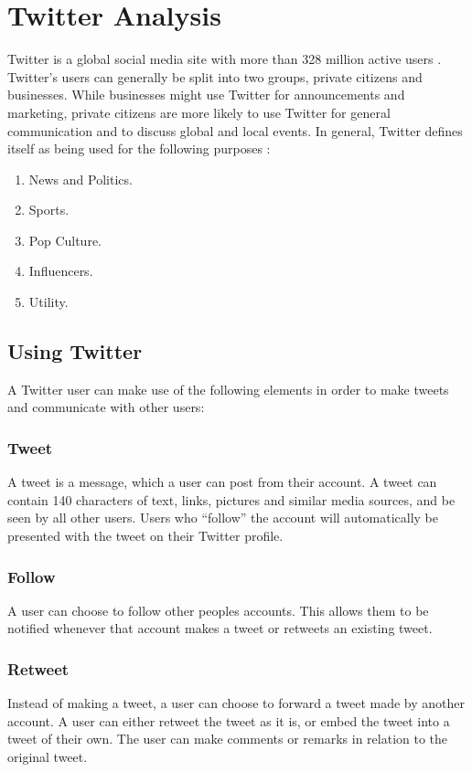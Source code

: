 \section{Twitter Analysis}\label{sec:twitter-analysis}
Twitter is a global social media site with more than 328 million active users
\citep{aboutTwitter}. Twitter's users can generally be split into two groups,
private citizens and businesses. While businesses might use Twitter for
announcements and marketing, private citizens are more likely to use Twitter for
general communication and to discuss global and local events. In general,
Twitter defines itself as being used for the following purposes
\citep{StartingTwitter}:

\begin{enumerate}    
  \item News and Politics.
  \item Sports.
  \item Pop Culture. 
  \item Influencers.
  \item Utility.
\end{enumerate} %

\subsection{Using Twitter}
A Twitter user can make use of the following elements \citep{StartingTwitter}
in order to make tweets and communicate with other users:

\subsubsection{Tweet}
A tweet is a message, which a user can post from their account. A tweet can
contain 140 characters\citep{StartingTwitter2} of text, links, pictures and
similar media sources, and be seen by all other users. Users who ``follow'' the
account will automatically be presented with the tweet on their Twitter profile.
\subsubsection{Follow}
A user can choose to follow other peoples accounts. This allows them to be
notified whenever that account makes a tweet or retweets an existing tweet.

\subsubsection{Retweet}
Instead of making a tweet, a user can choose to forward a tweet made by another
account. A user can either retweet the tweet as it is, or embed the tweet into a
tweet of their own. The user can make comments or remarks in relation to the
original tweet.

